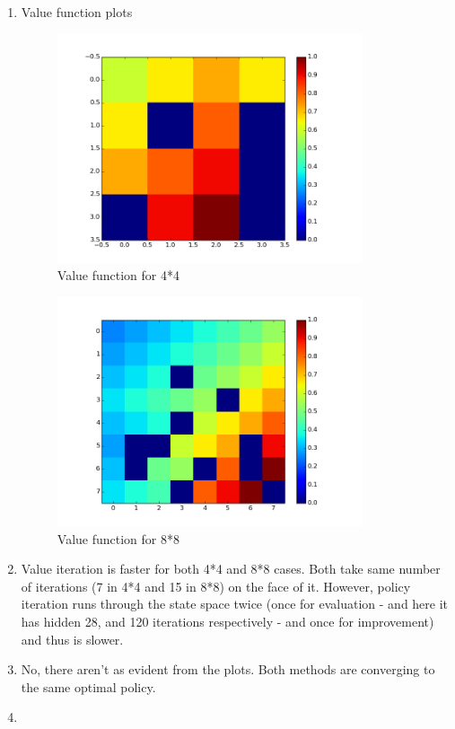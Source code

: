 \documentclass{article}
\begin{document}
\begin{enumerate}[label=(\alph*)]
\item 

Value function plots \\
\begin{figure}[H]
\centering
\includegraphics[width=90mm]{4_4_val_iter.png}
\caption{Value function for 4*4 \label{overflow}}
\end{figure}

\begin{figure}[H]
\centering
\includegraphics[width=90mm]{8_8_val_iter.png}
\caption{Value function for 8*8 \label{overflow}}
\end{figure}

\item 
Value iteration is faster for both 4*4 and 8*8 cases.
Both take same number of iterations (7 in 4*4 and 15 in 8*8) on the face of it. However, policy iteration runs through the state space twice (once for evaluation - and here it has hidden 28, and 120 iterations respectively - and once for improvement) and thus is slower.

\item
No, there aren't as evident from the plots. Both methods are converging to the same optimal policy. 

\item 


\end{enumerate}
\end{document}
